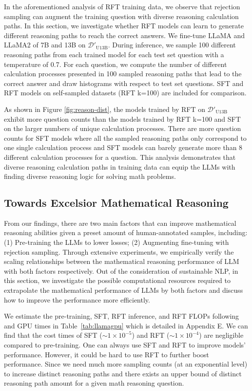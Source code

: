 \label{different_path}

In the aforementioned analysis of RFT training data, we observe that rejection sampling can augment the training question with diverse reasoning calculation paths. In this section, we investigate whether RFT models can learn to generate different reasoning paths to reach the correct answers. We fine-tune LLaMA and LLaMA2 of 7B and 13B on $\mathcal{D}'_{\text{U13B}}$. During inference, we sample 100 different reasoning paths from each trained model for each test set question with a temperature of 0.7. For each question, we compute the number of different calculation processes presented in 100 sampled reasoning paths that lead to the correct answer and draw histograms with respect to test set questions. SFT and RFT models on self-sampled datasets (RFT k=100) are included for comparison.

As shown in Figure \ref{fig:reason-dist}, the models trained by RFT on $\mathcal{D}'_{\text{U13B}}$ exhibit more question counts than the models trained by RFT k=100 and SFT on the larger numbers of unique calculation processes. There are more question counts for SFT models where all the sampled reasoning paths only correspond to one single calculation process and SFT models can barely generate more than 8 different calculation processes for a question. This analysis demonstrates that diverse reasoning calculation paths in training data can equip the LLMs with finding diverse reasoning logic for solving math problems. 

\subsection{Towards Excelsior Mathematical Reasoning}

From our findings, there are two main factors that can improve mathematical reasoning abilities given a preset amount of human-annotated samples, including: (1) Pre-training the LLMs to lower losses; (2) Augmenting fine-tuning with rejection sampling. Through extensive experiments, we empirically verify the scaling relationships between the mathematical reasoning performance of LLM with both factors respectively. Out of the consideration of sustainable NLP, in this section, we investigate the possible computational resources required to extrapolate the mathematical performance of LLMs by both factors and discuss how to improve the performance more efficiently. 

We estimate the pre-training, SFT, RFT inference, and RFT FLOPs following \cite{scalinglaw} and GPU times in Table~\ref{tab:llamagpu} which is detailed in Appendix E. We can find that the cost times of SFT ($\sim1\times10^{-5}$) and RFT ($\sim1\times10^{-4}$) are negligible compared to pre-training. One can always use SFT and RFT to improve models' performance. However, it could be hard to use RFT to further boost performance. Since we need much more sampling counts (at an exponential level) to increase distinct reasoning paths and there exists an upper bound of distinct reasoning path amount for a given math reasoning question.

